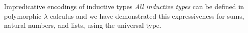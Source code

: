%
%
%  

\begin{frame}{Impredicative encodings of inductive types} 
  \emph{All inductive types} can be defined in polymorphic $\lambda$-calculus and we have demonstrated this expressiveness for sums, natural numbers, and lists, using the universal type.

\end{frame}

%

